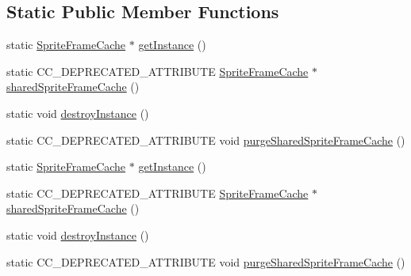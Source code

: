 \subsection*{Static Public Member Functions}
\begin{DoxyCompactItemize}
\item 
static \hyperlink{classSpriteFrameCache}{Sprite\+Frame\+Cache} $\ast$ \hyperlink{classSpriteFrameCache_afc6f3a882c36cfd48e4b450a6fcbf535}{get\+Instance} ()
\item 
static C\+C\+\_\+\+D\+E\+P\+R\+E\+C\+A\+T\+E\+D\+\_\+\+A\+T\+T\+R\+I\+B\+U\+TE \hyperlink{classSpriteFrameCache}{Sprite\+Frame\+Cache} $\ast$ \hyperlink{classSpriteFrameCache_ae6820c8de5c9a514a1702af512c547d7}{shared\+Sprite\+Frame\+Cache} ()
\item 
static void \hyperlink{classSpriteFrameCache_af23cb4be28289ff0cf3d5e88afe56046}{destroy\+Instance} ()
\item 
static C\+C\+\_\+\+D\+E\+P\+R\+E\+C\+A\+T\+E\+D\+\_\+\+A\+T\+T\+R\+I\+B\+U\+TE void \hyperlink{classSpriteFrameCache_a56768e2b3b8574dbe135862684548562}{purge\+Shared\+Sprite\+Frame\+Cache} ()
\item 
static \hyperlink{classSpriteFrameCache}{Sprite\+Frame\+Cache} $\ast$ \hyperlink{classSpriteFrameCache_a0ebc800732ea727e2c355f0dfa154229}{get\+Instance} ()
\item 
static C\+C\+\_\+\+D\+E\+P\+R\+E\+C\+A\+T\+E\+D\+\_\+\+A\+T\+T\+R\+I\+B\+U\+TE \hyperlink{classSpriteFrameCache}{Sprite\+Frame\+Cache} $\ast$ \hyperlink{classSpriteFrameCache_ae6820c8de5c9a514a1702af512c547d7}{shared\+Sprite\+Frame\+Cache} ()
\item 
static void \hyperlink{classSpriteFrameCache_a6086d8302dc1f9537fdf85d59d35ff9a}{destroy\+Instance} ()
\item 
static C\+C\+\_\+\+D\+E\+P\+R\+E\+C\+A\+T\+E\+D\+\_\+\+A\+T\+T\+R\+I\+B\+U\+TE void \hyperlink{classSpriteFrameCache_a56768e2b3b8574dbe135862684548562}{purge\+Shared\+Sprite\+Frame\+Cache} ()
\end{DoxyCompactItemize}
